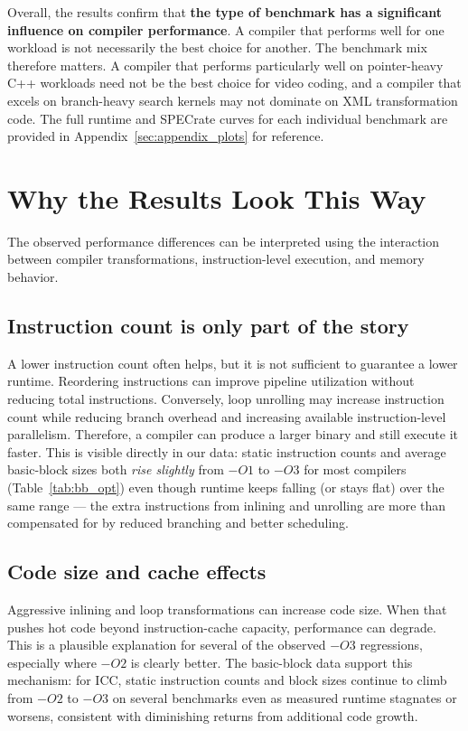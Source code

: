 \documentclass[11pt,a4paper]{article}
\begin{document}
Overall, the results confirm that \textbf{the type of benchmark has a
significant influence on compiler performance}. A compiler that performs well
for one workload is not necessarily the best choice for another. The benchmark mix therefore matters. A compiler that performs particularly well on pointer-heavy C++ workloads need not be the best choice for video coding, and a compiler that excels on branch-heavy search kernels may not dominate on XML transformation code. The full runtime and SPECrate curves for each individual benchmark are provided in Appendix~\ref{sec:appendix_plots} for reference.

\label{sec:q2_wins}

\section{Why the Results Look This Way}

The observed performance differences can be interpreted using the interaction between compiler transformations, instruction-level execution, and memory behavior.

\subsection{Instruction count is only part of the story}
A lower instruction count often helps, but it is not sufficient to guarantee a lower runtime. Reordering instructions can improve pipeline utilization without reducing total instructions. Conversely, loop unrolling may increase instruction count while reducing branch overhead and increasing available instruction-level parallelism. Therefore, a compiler can produce a larger binary and still execute it faster. This is visible directly in our data: static instruction counts and average basic-block sizes both \emph{rise slightly} from $-O1$ to $-O3$ for most compilers (Table~\ref{tab:bb_opt}) even though runtime keeps falling (or stays flat) over the same range --- the extra instructions from inlining and unrolling are more than compensated for by reduced branching and better scheduling.

\subsection{Code size and cache effects}
Aggressive inlining and loop transformations can increase code size. When that pushes hot code beyond instruction-cache capacity, performance can degrade. This is a plausible explanation for several of the observed $-O3$ regressions, especially where $-O2$ is clearly better. The basic-block data support this mechanism: for ICC, static instruction counts and block sizes continue to climb from $-O2$ to $-O3$ on several benchmarks even as measured runtime stagnates or worsens, consistent with diminishing returns from additional code growth.
\end{document}
